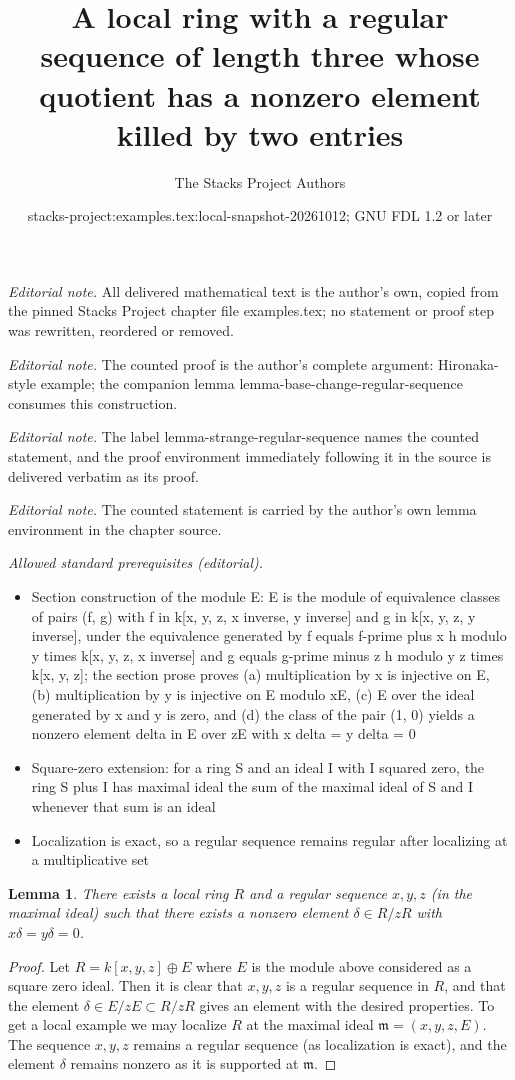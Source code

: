 \documentclass[10pt,a4paper]{amsart}
\title{A local ring with a regular sequence of length three whose quotient has a nonzero element killed by two entries}
\author{The Stacks Project Authors}
\date{stacks-project:examples.tex:local-snapshot-20261012; GNU FDL 1.2 or later}
\theoremstyle{plain}
\newtheorem{lemma}[subsection]{Lemma}
\theoremstyle{definition}
\theoremstyle{remark}
\numberwithin{equation}{subsection}
\begin{document}
\maketitle
\noindent\textit{Editorial note.} All delivered mathematical text is the author's own, copied from the pinned Stacks Project chapter file examples.tex; no statement or proof step was rewritten, reordered or removed.\par\medskip
\noindent\textit{Editorial note.} The counted proof is the author's complete argument: Hironaka-style example; the companion lemma lemma-base-change-regular-sequence consumes this construction.\par\medskip
\noindent\textit{Editorial note.} The label lemma-strange-regular-sequence names the counted statement, and the proof environment immediately following it in the source is delivered verbatim as its proof.\par\medskip
\noindent\textit{Editorial note.} The counted statement is carried by the author's own lemma environment in the chapter source.\par\medskip
\noindent\textit{Allowed standard prerequisites (editorial).}\begin{itemize}
\item Section construction of the module E: E is the module of equivalence classes of pairs (f, g) with f in k[x, y, z, x inverse, y inverse] and g in k[x, y, z, y inverse], under the equivalence generated by f equals f-prime plus x h modulo y times k[x, y, z, x inverse] and g equals g-prime minus z h modulo y z times k[x, y, z]; the section prose proves (a) multiplication by x is injective on E, (b) multiplication by y is injective on E modulo xE, (c) E over the ideal generated by x and y is zero, and (d) the class of the pair (1, 0) yields a nonzero element delta in E over zE with x delta = y delta = 0
\item Square-zero extension: for a ring S and an ideal I with I squared zero, the ring S plus I has maximal ideal the sum of the maximal ideal of S and I whenever that sum is an ideal
\item Localization is exact, so a regular sequence remains regular after localizing at a multiplicative set
\end{itemize}\medskip
\begin{lemma}
\label{lemma-strange-regular-sequence}
There exists a local ring $R$ and a regular sequence $x, y, z$
(in the maximal ideal) such that there exists a nonzero element
$\delta \in R/zR$ with $x\delta = y\delta = 0$.
\end{lemma}

\begin{proof}
Let $R = k[x, y, z] \oplus E$ where $E$ is the module above considered
as a square zero ideal. Then it is clear that $x, y, z$ is a regular
sequence in $R$, and that the element $\delta \in E/zE \subset R/zR$
gives an element with the desired properties. To get a local example
we may localize $R$ at the maximal ideal $\mathfrak m = (x, y, z, E)$.
The sequence $x, y, z$ remains a regular sequence (as localization is
exact), and the element $\delta$ remains nonzero as it is supported
at $\mathfrak m$.
\end{proof}
\end{document}
